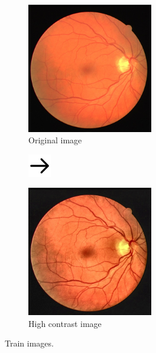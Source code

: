 \begin{frame}{\insertsectionhead}
  \begin{figure}[H]
    \begin{subfigure}{5.5cm}
      \includegraphics[width=5.5cm]{Graphics/train.jpg}
      \caption{Original image}
    \end{subfigure}
    \begin{subfigure}{1cm}
      \includegraphics[width=1cm]{Graphics/rightarrow.png}
    \end{subfigure}
    \begin{subfigure}{5.5cm}
      \includegraphics[width=5.5cm]{Graphics/high_contrast.jpg}
      \caption{High contrast image}
    \end{subfigure}
    \caption{Train images.}
  \end{figure}
\end{frame}

